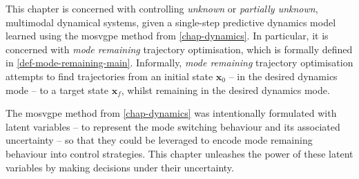 \documentclass{mimosis-class/mimosis}
\numberwithin{equation}{chapter}
\newcommand{\state}{\ensuremath{\mathbf{x}}}
\newcommand{\control}{\ensuremath{\mathbf{u}}}
\newcommand{\modeVar}{\ensuremath{\alpha}}
\begin{document}
{\newcommand{\stateDiff}{\ensuremath{\Delta \state}}

\renewcommand{\stateCostMatrix}{\ensuremath{\mathbf{Q}}}
\renewcommand{\controlCostMatrix}{\ensuremath{\mathbf{R}}}
\renewcommand{\terminalStateCostMatrix}{\ensuremath{\mathbf{H}}}
\renewcommand{\approxExpectedCost}{\ensuremath{J(\stateTraj, \controlTraj)}}

\renewcommand{\terminalState}{\ensuremath{\state_{\TimeInd}}}

\newcommand{\stateMean}{\ensuremath{\bm\mu_{\state_\timeInd}}}
\newcommand{\stateCov}{\ensuremath{\bm\Sigma_{\state_\timeInd}}}
\newcommand{\terminalStateMean}{\ensuremath{\bm\mu_{\state_\TimeInd}}}
\newcommand{\terminalStateCov}{\ensuremath{\bm\Sigma_{\state_\TimeInd}}}
\newcommand{\controlMean}{\ensuremath{\bm\mu_{\control_\timeInd}}}
\newcommand{\controlCov}{\ensuremath{\bm\Sigma_{\control_\timeInd}}}
\newcommand{\stateDiff}{\ensuremath{\Delta \state}}
\newcommand{\stateDiffMean}{\ensuremath{\bm\mu_{\stateDiff_\timeInd}}}
\newcommand{\stateDiffCov}{\ensuremath{\bm\Sigma_{\stateDiff_\timeInd}}}

\renewcommand{\transitionDistK}{\ensuremath{p(\state_{\timeInd+1} \mid \state_\timeInd, \control_\timeInd, \modeVar_{\timeInd}=\desiredMode)}}
This chapter is concerned with controlling \emph{unknown} or \emph{partially unknown}, multimodal dynamical systems,
given a single-step predictive dynamics model learned using the \acrshort{mosvgpe} method from \cref{chap-dynamics}.
In particular, it is concerned with \emph{mode remaining} trajectory optimisation, which
is formally defined in \cref{def-mode-remaining-main}.
Informally, \emph{mode remaining} trajectory optimisation attempts to find trajectories
from an initial state \(\state_0\) -- in the desired dynamics mode -- to a target state \(\state_f\),
whilst remaining in the desired dynamics mode.

The \acrshort{mosvgpe} method from \cref{chap-dynamics} was intentionally formulated with latent variables
-- to represent the mode switching behaviour and its associated uncertainty -- so that they could be leveraged
to encode mode remaining behaviour into control strategies.
This chapter unleashes the power of these latent variables by making decisions under their uncertainty.

}
\end{document}
